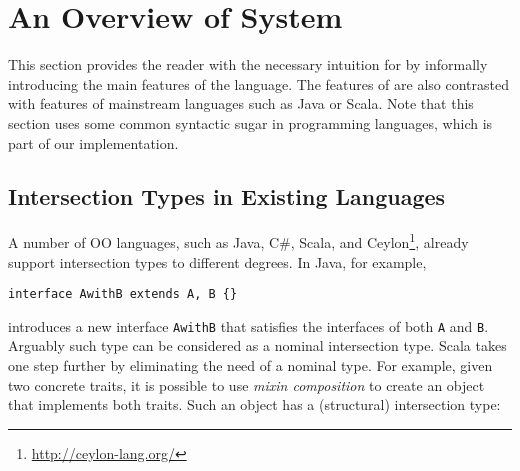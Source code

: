 \section{An Overview of System \name}



This section provides the reader with the necessary intuition for
\name by informally introducing the main features of the language.
The features of \name are also contrasted with features of mainstream
languages such as Java or Scala. Note that this section uses some 
common syntactic sugar in programming languages, which is 
part of our implementation.
 

\subsection{Intersection Types in Existing Languages}\label{subsec:interScala}

A number of OO languages, such as Java, C\#, Scala, and
Ceylon\footnote{\url{http://ceylon-lang.org/}}, already support intersection
types to different degrees. In Java, for example,

\begin{lstlisting}
interface AwithB extends A, B {}
\end{lstlisting}

\noindent introduces a new interface \lstinline{AwithB} that satisfies the interfaces of
both \lstinline{A} and \lstinline{B}. Arguably such type can be considered as a nominal
intersection type. Scala takes one step further by eliminating the
need of a nominal type. For example, given two concrete traits, it is possible to
use \emph{mixin composition} to create an object that implements both 
traits. Such an object has a (structural) intersection type:

